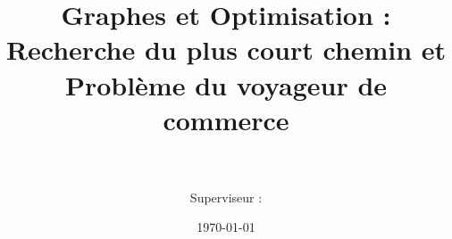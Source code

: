 \title{Graphes et Optimisation : Recherche du plus court chemin et Problème du voyageur de commerce\\ \vspace{0.5cm} \LARGE{\textbf{\projecttitle}} \vspace{0.75cm}}
\author{\students \\ \vspace{1cm} \\ Superviseur : \tutor}
\date{\today}